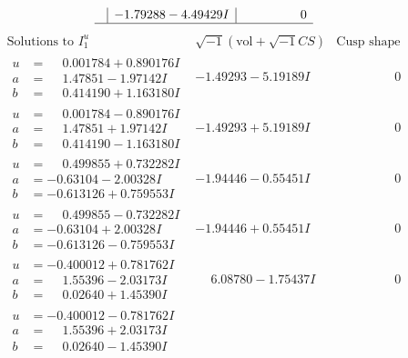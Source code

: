 \documentclass[1p]{elsarticle_modified}
\theoremstyle{definition}
\newcommand{\I}{\sqrt{-1}}
\begin{document}
$$\begin{array}{c|c|c}
 & -1.79288 - 4.49429 I & \phantom{-0.000000 } 0\\
 \hline 
 \end{array}$$\newpage$$\begin{array}{c|c|c}  
\text{Solutions to }I^u_{1}& \I (\text{vol} + \sqrt{-1}CS) & \text{Cusp shape}\\
 \hline 
\begin{aligned}
u &= \phantom{-}0.001784 + 0.890176 I \\
a &= \phantom{-}1.47851 - 1.97142 I \\
b &= \phantom{-}0.414190 + 1.163180 I\end{aligned}
 & -1.49293 - 5.19189 I & \phantom{-0.000000 } 0 \\ \hline\begin{aligned}
u &= \phantom{-}0.001784 - 0.890176 I \\
a &= \phantom{-}1.47851 + 1.97142 I \\
b &= \phantom{-}0.414190 - 1.163180 I\end{aligned}
 & -1.49293 + 5.19189 I & \phantom{-0.000000 } 0 \\ \hline\begin{aligned}
u &= \phantom{-}0.499855 + 0.732282 I \\
a &= -0.63104 - 2.00328 I \\
b &= -0.613126 + 0.759553 I\end{aligned}
 & -1.94446 - 0.55451 I & \phantom{-0.000000 } 0 \\ \hline\begin{aligned}
u &= \phantom{-}0.499855 - 0.732282 I \\
a &= -0.63104 + 2.00328 I \\
b &= -0.613126 - 0.759553 I\end{aligned}
 & -1.94446 + 0.55451 I & \phantom{-0.000000 } 0 \\ \hline\begin{aligned}
u &= -0.400012 + 0.781762 I \\
a &= \phantom{-}1.55396 - 2.03173 I \\
b &= \phantom{-}0.02640 + 1.45390 I\end{aligned}
 & \phantom{-}6.08780 - 1.75437 I & \phantom{-0.000000 } 0 \\ \hline\begin{aligned}
u &= -0.400012 - 0.781762 I \\
a &= \phantom{-}1.55396 + 2.03173 I \\
b &= \phantom{-}0.02640 - 1.45390 I\end{aligned}

\end{array}$$
\end{document}
